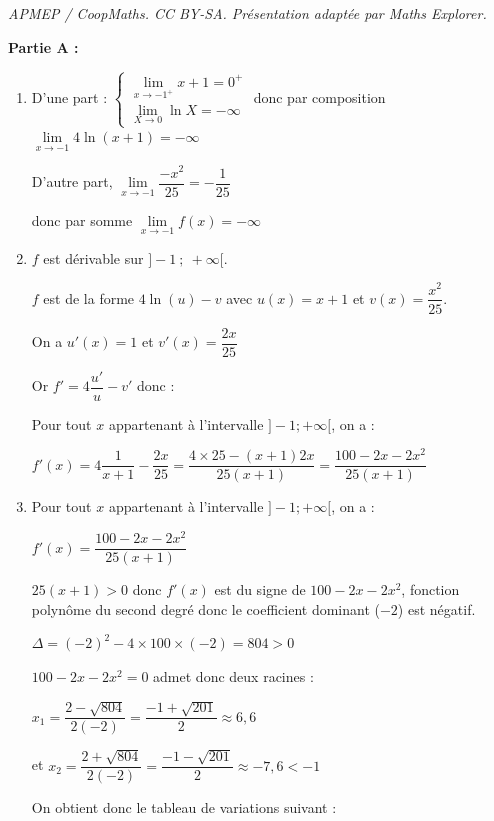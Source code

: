 \documentclass[10pt]{article}
\begin{document}
\noindent\textit{APMEP / CoopMaths. CC BY-SA. Présentation adaptée par Maths Explorer.}\par\medskip
\medskip

\textbf{Partie A : }

\begin{enumerate}
\item D'une part :  $\begin{cases}
\lim\limits_{x \to -1^+} x+1 = 0^+ \\
\lim\limits_{X \to 0} \ln X = -\infty
\end{cases}$ donc par composition $\lim\limits_{x \to -1} 4\ln (x+1) =-\infty$ 

D'autre part, $\lim\limits_{x \to -1}\dfrac{-x^2}{25}= -\dfrac{1}{25}$ 

donc par somme $\lim\limits_{x \to -1}f(x) = -\infty$



\item $f$ est dérivable sur $]-1~;~+\infty[$.

$f$ est de la forme $4\ln(u) - v$ avec $u(x) = x + 1$ et $v(x) = \dfrac {x^2}{25}$.

On a  $u'(x) =1$ et $v'(x)= \dfrac{2x}{25}$

Or $f'= 4 \dfrac{u'}{u}-v'$ donc :

Pour tout $x$ appartenant à l'intervalle $]-1 ;+\infty[$, on a :

$f'(x) = 4 \dfrac{1}{x+1}- \dfrac{2x}{25}= \dfrac{4 \times 25 -(x+1)2x}{25(x+1)}= \dfrac{100-2 x-2 x^{2}}{25(x+1)}
$
\item Pour tout $x$ appartenant à l'intervalle $]-1 ;+\infty[$, on a :

$f'(x) = \dfrac{100-2 x-2 x^{2}}{25(x+1)}$ 

$25(x+1)>0$ donc $f'(x)$ est du signe de $100 - 2x - 2x^2$, fonction polynôme du second degré donc le coefficient dominant ($-2$) est négatif.

$\Delta = (-2)^2-4 \times 100 \times (-2)= 804 > 0$

$100-2x-2x^2=0$ admet donc deux racines :

$x_1 = \dfrac{2-\sqrt{804}}{2(-2)}= \dfrac{-1+\sqrt{201}}{2} \approx 6,6$

et $x_2 = \dfrac{2+\sqrt{804}}{2(-2)}= \dfrac{-1-\sqrt{201}}{2} \approx -7,6 <-1$

On obtient donc le tableau de variations suivant :

\hfill~	~\hfill~


\end{enumerate}
\end{document}
